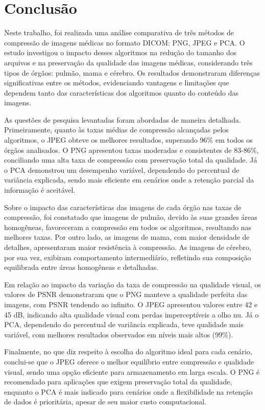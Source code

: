 \chapter{Conclusão}
\label{cap:conclusao}

Neste trabalho, foi realizada uma análise comparativa de três métodos de compressão de imagens médicas no formato \acrshort{DICOM}: \acrshort{PNG}, \acrshort{JPEG} e \acrshort{PCA}. O estudo investigou o impacto desses algoritmos na redução do tamanho dos arquivos e na preservação da qualidade das imagens médicas, considerando três tipos de órgãos: pulmão, mama e cérebro. Os resultados demonstraram diferenças significativas entre os métodos, evidenciando vantagens e limitações que dependem tanto das características dos algoritmos quanto do conteúdo das imagens.

As questões de pesquisa levantadas foram abordadas de maneira detalhada. Primeiramente, quanto às taxas médias de compressão alcançadas pelos algoritmos, o \acrshort{JPEG} obteve os melhores resultados, superando 96\% em todos os órgãos analisados. O \acrshort{PNG} apresentou taxas moderadas e consistentes de 83-86\%, conciliando uma alta taxa de compressão com preservação total da qualidade. Já o \acrshort{PCA} demonstrou um desempenho variável, dependendo do percentual de variância explicada, sendo mais eficiente em cenários onde a retenção parcial da informação é aceitável.

Sobre o impacto das características das imagens de cada órgão nas taxas de compressão, foi constatado que imagens de pulmão, devido às suas grandes áreas homogêneas, favoreceram a compressão em todos os algoritmos, resultando nas melhores taxas. Por outro lado, as imagens de mama, com maior densidade de detalhes, apresentaram maior resistência à compressão. As imagens de cérebro, por sua vez, exibiram comportamento intermediário, refletindo sua composição equilibrada entre áreas homogêneas e detalhadas.

Em relação ao impacto da variação da taxa de compressão na qualidade visual, os valores de \acrshort{PSNR} demonstraram que o \acrshort{PNG} manteve a qualidade perfeita das imagens, com \acrshort{PSNR} tendendo ao infinito. O \acrshort{JPEG} apresentou valores entre 42 e 45 dB, indicando alta qualidade visual com perdas imperceptíveis a olho nu. Já o \acrshort{PCA}, dependendo do percentual de variância explicada, teve qualidade mais variável, com melhores resultados observados em níveis mais altos (99\%).

Finalmente, no que diz respeito à escolha do algoritmo ideal para cada cenário, conclui-se que o \acrshort{JPEG} oferece o melhor equilíbrio entre compressão e qualidade visual, sendo uma opção eficiente para armazenamento em larga escala. O \acrshort{PNG} é recomendado para aplicações que exigem preservação total da qualidade, enquanto o \acrshort{PCA} é mais indicado para cenários onde a flexibilidade na retenção de dados é prioritária, apesar de seu maior custo computacional.

